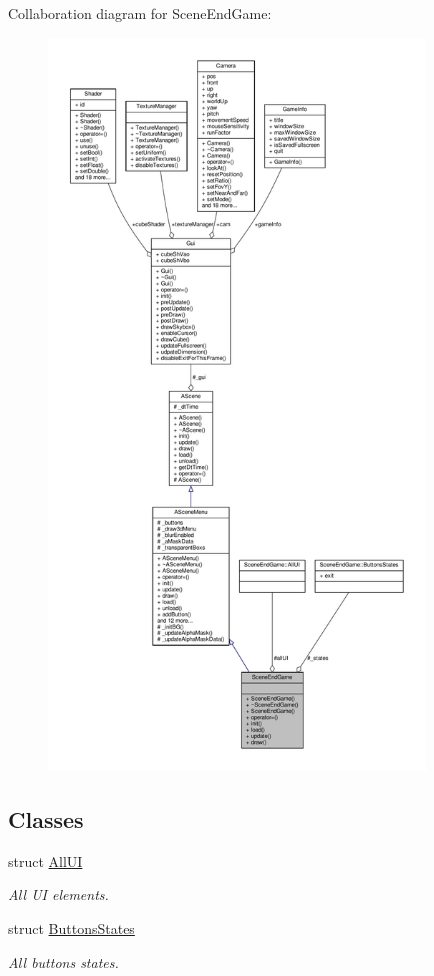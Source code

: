 Collaboration diagram for Scene\+End\+Game\+:
\nopagebreak
\begin{figure}[H]
\begin{center}
\leavevmode
\includegraphics[height=550pt]{class_scene_end_game__coll__graph}
\end{center}
\end{figure}
\subsection*{Classes}
\begin{DoxyCompactItemize}
\item 
struct \hyperlink{struct_scene_end_game_1_1_all_u_i}{All\+UI}
\begin{DoxyCompactList}\small\item\em All UI elements. \end{DoxyCompactList}\item 
struct \hyperlink{struct_scene_end_game_1_1_buttons_states}{Buttons\+States}
\begin{DoxyCompactList}\small\item\em All buttons states. \end{DoxyCompactList}\end{DoxyCompactItemize}
